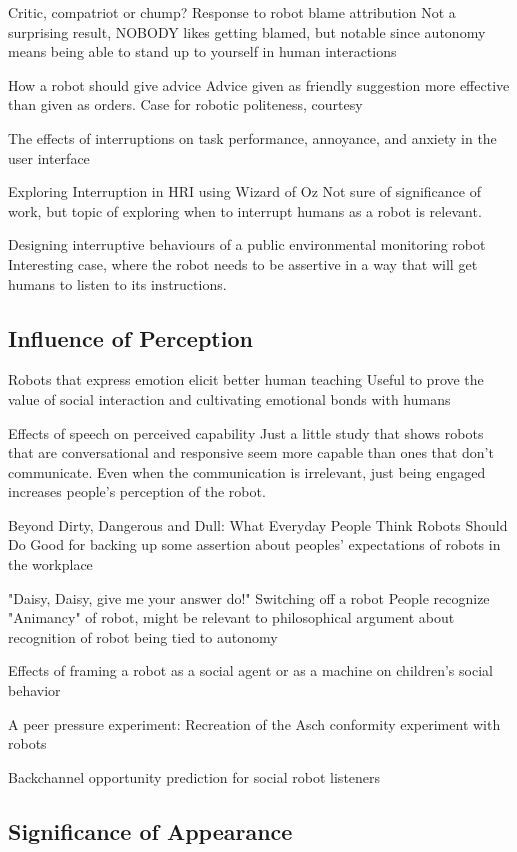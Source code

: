 \documentclass{sfuthesis}
\begin{document}
Critic, compatriot or chump? Response to robot blame attribution	Not a surprising result, NOBODY likes getting blamed, but notable since autonomy means being able to stand up to yourself in human interactions

How a robot should give advice	Advice given as friendly suggestion more effective than given as orders. Case for robotic politeness, courtesy

The effects of interruptions on task performance, annoyance, and anxiety in the user interface

Exploring Interruption in HRI using Wizard of Oz	Not sure of significance of work, but topic of exploring when to interrupt humans as a robot is relevant.	

Designing interruptive behaviours of a public environmental monitoring robot	Interesting
 case, where the robot needs to be assertive in a way that will get humans to listen to its instructions.	

\subsection{Influence of Perception}

Robots that express emotion elicit better human teaching	Useful to prove the value of social interaction and cultivating emotional bonds with humans	

Effects of speech on perceived capability	Just a little study that shows robots that are conversational and responsive seem more capable than ones that don't communicate. Even when the communication is irrelevant, just being engaged increases people's perception of the robot.	

Beyond Dirty, Dangerous and Dull: What Everyday People Think Robots Should Do	Good for backing up some assertion about peoples' expectations of robots in the workplace	

"Daisy, Daisy, give me your answer do!" Switching off a robot	People recognize "Animancy" of robot, might be relevant to philosophical argument about recognition of robot being tied to autonomy	

Effects of framing a robot as a social agent or as a machine on children's social behavior

A peer pressure experiment: Recreation of the Asch conformity experiment with robots

Backchannel opportunity prediction for social robot listeners

\subsection{Significance of Appearance}
\end{document}
